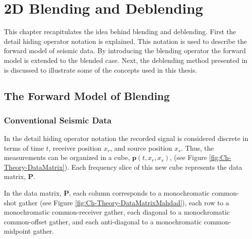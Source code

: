 \chapter{2D Blending and Deblending} \label{chap:theory}

This chapter recapitulates the idea behind blending and deblending. First the detail hiding operator notation is explained. This notation is used to describe the forward model of seismic data. By introducing the blending operator the forward model is extended to the blended case. Next, the deblending method presented in \citet{Mahdad-Deblending-Method} is discussed to illustrate some of the concepts used in this thesis.

\section{The Forward Model of Blending} \label{sec:Ch-Theory-Operator}

\subsection{Conventional Seismic Data}
In the detail hiding operator notation \citep{Berkhout1982} the recorded signal is considered discrete in terms of time $t$, receiver position $x_r$, and source position $x_s$. Thus, the measurements can be organized in a cube, $\mathbf{p}(t,x_r,x_s)$, (see Figure \ref{fig:Ch-Theory-DataMatrix}). Each frequency slice of this new cube represents the data matrix, $\mathbf{P}$.

In the data matrix, $\mathbf{P}$, each column corresponds to a monochromatic common-shot gather (see Figure \ref{fig:Ch-Theory-DataMatrixMahdad}), each row to a monochromatic common-receiver gather, each diagonal to a monochromatic common-offset gather, and each anti-diagonal to a monochromatic common-midpoint gather. 

